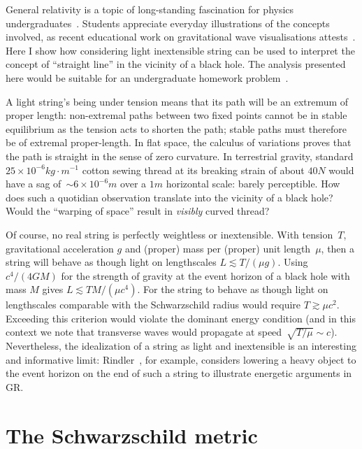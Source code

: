 \documentclass{ws-tpe}
\begin{document}
General relativity is a topic of long-standing fascination for physics
undergraduates~\cite{christensen2012}.  Students appreciate everyday
illustrations of the concepts involved, as recent educational work on
gravitational wave visualisations attests~\cite{overduin2018}.  Here I
show how considering light inextensible string can be used to
interpret the concept of ``straight line'' in the vicinity of a black
hole.  The analysis presented here would be suitable for an
undergraduate homework problem~\cite{romano2019}.

A light string's being under tension means that its path will be an
extremum of proper length: non-extremal paths between two fixed points
cannot be in stable equilibrium as the tension acts to shorten the
path; stable paths must therefore be of extremal proper-length.
In flat space, the calculus of variations
proves that the path is straight in the sense of zero curvature.  In
terrestrial gravity, standard $25\times
10^{-6}\unit{kg}\cdot\unit{m}^{-1}$ cotton sewing thread at its
breaking strain of about $40\unit{N}$ would have a sag of~${\sim}
6\times 10^{-6}\unit{m}$ over a $1\unit{m}$ horizontal scale: barely
perceptible.  How does such a quotidian observation translate into the
vicinity of a black hole?  Would the ``warping of space'' result in
{\em visibly} curved thread?

Of course, no real string is perfectly weightless or inextensible.
With tension~$T$, gravitational acceleration $g$ and (proper) mass per
(proper) unit length~$\mu$, then a string will behave as though light
on lengthscales $L\lesssim T/\left(\mu g\right)$.  Using
$c^4/\left(4GM\right)$ for the strength of gravity at the event
horizon of a black hole with mass $M$ gives $L\lesssim TM/\left(\mu
c^4\right)$.  For the string to behave as though light on lengthscales
comparable with the Schwarzschild radius would require $T\gtrsim\mu
c^2$.  Exceeding this criterion would violate the dominant energy
condition (and in this context we note that transverse waves would
propagate at speed~$\sqrt{T/\mu}\sim c$).  Nevertheless, the
idealization of a string as light and inextensible is an interesting
and informative limit: Rindler~\cite{rindler}, for example, considers
lowering a heavy object to the event horizon on the end of such a
string to illustrate energetic arguments in GR.

\section{The Schwarzschild metric}
\end{document}
